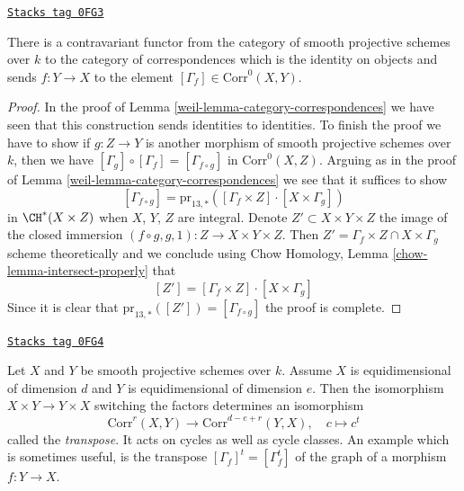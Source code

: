 \begin{lemma}
\label{weil-lemma-contravariant-functor}
\href{https://stacks.math.columbia.edu/tag/0FG3}{\texttt{Stacks tag 0FG3}}

There is a contravariant functor from the category of smooth
projective schemes over $k$ to the category of correspondences
which is the identity on objects and sends $f : Y \to X$ to
the element $[\Gamma_f] \in \text{Corr}^0(X, Y)$.
\end{lemma}

\begin{proof}

In the proof of Lemma \ref{weil-lemma-category-correspondences}
we have seen that this construction sends identities to
identities. To finish the proof we have to show if $g : Z \to Y$
is another morphism of smooth projective schemes over $k$, then we have
$[\Gamma_g] \circ [\Gamma_f] = [\Gamma_{f \circ g}]$ in
$\text{Corr}^0(X, Z)$. Arguing as in the proof of
Lemma \ref{weil-lemma-category-correspondences} we see that it
suffices to show
$$
[\Gamma_{f \circ g}] =
\text{pr}_{13, *}([\Gamma_f \times Z] \cdot [X \times \Gamma_g])
$$
in $\CH^*(X \times Z)$ when $X$, $Y$, $Z$ are integral.
Denote $Z' \subset X \times Y \times Z$ the image of the closed immersion
$(f \circ g, g, 1) : Z \to X \times Y \times Z$.
Then $Z' = \Gamma_f \times Z \cap X \times \Gamma_g$
scheme theoretically and we conclude using
Chow Homology, Lemma \ref{chow-lemma-intersect-properly}
that
$$
[Z'] = [\Gamma_f \times Z] \cdot [X \times \Gamma_g]
$$
Since it is clear that $\text{pr}_{13, *}([Z']) = [\Gamma_{f \circ g}]$
the proof is complete.
\end{proof}

\begin{remark}[Transpose]
\label{weil-remark-transpose}
\href{https://stacks.math.columbia.edu/tag/0FG4}{\texttt{Stacks tag 0FG4}}

Let $X$ and $Y$ be smooth projective schemes over $k$.
Assume $X$ is equidimensional of dimension $d$ and
$Y$ is equidimensional of dimension $e$. Then the isomorphism
$X \times Y \to Y \times X$ switching the factors determines
an isomorphism
$$
\text{Corr}^r(X, Y) \longrightarrow \text{Corr}^{d - e + r}(Y, X),\quad
c \longmapsto c^t
$$
called the {\it transpose}. It acts on cycles as well as cycle classes.
An example which is sometimes useful, is the transpose
$[\Gamma_f]^t = [\Gamma_f^t]$ of the graph of a morphism $f : Y \to X$.
\end{remark}

